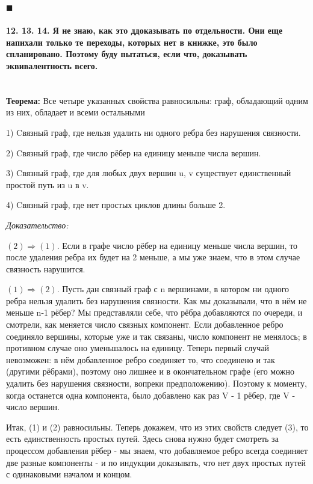 \documentclass[a4paper, 12pt]{article}
\newcommand{\parag}[1]{\paragraph{#1}\mbox{}\\}
\begin{document}
\noindent
$\blacksquare$

\parag{12. 13. 14. Я не знаю, как это ддоказывать по отдельности. Они еще напихали только те переходы, которых нет в книжке, это было спланировано. Поэтому буду пытаться, если что, доказывать эквивалентность всего.}
\textbf{Теорема:} Все четыре указанных свойства равносильны: граф, обладающий одним из них, обладает и всеми остальными

1) Cвязный граф, где нельзя удалить ни одного ребра без нарушения связности.

2) Cвязный граф, где число рёбер на единицу меньше числа вершин.

3) Cвязный граф, где для любых двух вершин u, v существует единственный простой путь из u в v.

4) Cвязный граф, где нет простых циклов длины больше 2.

\noindent
\textit{Доказательство:}

\noindent
$(2) \Rightarrow (1)$. Если в графе число рёбер на единицу меньше числа вершин, то после удаления ребра их будет на 2 меньше, а мы уже знаем, что в этом случае связность нарушится.

\noindent
$(1) \Rightarrow (2)$. Пусть дан связный граф с n вершинами, в котором ни одного ребра нельзя удалить без нарушения связности. Как мы доказывали, что в нём не меньше n-1 рёбер? Мы представляли себе, что рёбра добавляются по очереди, и смотрели, как меняется число связных компонент. Если добавленное ребро соединяло вершины, которые уже и так связаны, число компонент не менялось; в противном случае оно уменьшалось на единицу. Теперь первый случай невозможен: в нём добавленное ребро соединяет то, что соединено и так (другими рёбрами), поэтому оно лишнее и в окончательном графе (его можно удалить без нарушения связности, вопреки предположению). Поэтому к моменту, когда останется одна компонента, было добавлено как раз V - 1 рёбер, где V - число вершин.

\noindent
Итак, (1) и (2) равносильны. Теперь докажем, что из этих свойств следует (3), то есть единственность простых путей. Здесь снова нужно будет смотреть за процессом добавления рёбер - мы знаем, что добавляемое ребро всегда соединяет две разные компоненты - и по индукции доказывать, что нет двух простых путей с одинаковыми началом и концом.
\end{document}
